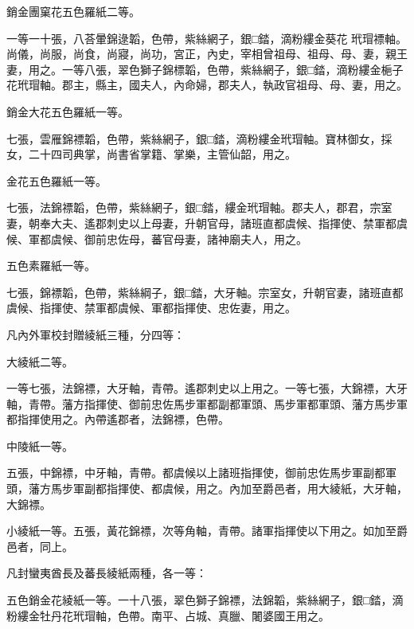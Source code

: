 \begin{pinyinscope}
 銷金團窠花五色羅紙二等。



 一等一十張，八荅暈錦逯韜，色帶，紫絲網子，銀□錔，滴粉縷金葵花
 玳瑁褾軸。尚儀，尚服，尚食，尚寢，尚功，宮正，內史，宰相曾祖母、祖母、母、妻，親王妻，用之。一等八張，翠色獅子錦標韜，色帶，紫絲網子，銀□錔，滴粉縷金梔子花玳瑁軸。郡主，縣主，國夫人，內命婦，郡夫人，執政官祖母、母、妻，用之。



 銷金大花五色羅紙一等。



 七張，雲雁錦褾韜，色帶，紫絲網子，銀□錔，滴粉縷金玳瑁軸。寶林御女，採女，二十四司典掌，尚書省掌籍、掌樂，主管仙韶，用之。



 金花五色羅紙一等。



 七張，法錦褾韜，色帶，紫絲網子，銀□錔，縷金玳瑁軸。郡夫人，郡君，宗室妻，朝奉大夫、遙郡刺史以上母妻，升朝官母，諸班直都虞候、指揮使、禁軍都虞候、軍都虞候、御前忠佐母，蕃官母妻，諸神廟夫人，用之。



 五色素羅紙一等。



 七張，錦褾韜，色帶，紫絲綱子，銀□錔，大牙軸。宗室女，升朝官妻，諸班直都虞候、指揮使、禁軍都虞候、軍都指揮使、忠佐妻，用之。



 凡內外軍校封贈綾紙三種，分四等：



 大綾紙二等。



 一等七張，法錦褾，大牙軸，青帶。遙郡刺史以上用之。一等七張，大錦褾，大牙軸，青帶。藩方指揮使、御前忠佐馬步軍都副都軍頭、馬步軍都軍頭、藩方馬步軍都指揮使用之。內帶遙郡者，法錦褾，色帶。



 中陵紙一等。



 五張，中錦褾，中牙軸，青帶。都虞候以上諸班指揮使，御前忠佐馬步軍副都軍頭，藩方馬步軍副都指揮使、都虞候，用之。內加至爵邑者，用大綾紙，大牙軸，大錦褾。



 小綾紙一等。五張，黃花錦褾，次等角軸，青帶。諸軍指揮使以下用之。如加至爵邑者，同上。



 凡封蠻夷酋長及蕃長綾紙兩種，各一等：



 五色銷金花綾紙一等。一十八張，翠色獅子錦褾，法錦韜，紫絲網子，銀□錔，滴粉縷金牡丹花玳瑁軸，色帶。南平、占城、真臘、闍婆國王用之。




\end{pinyinscope}
